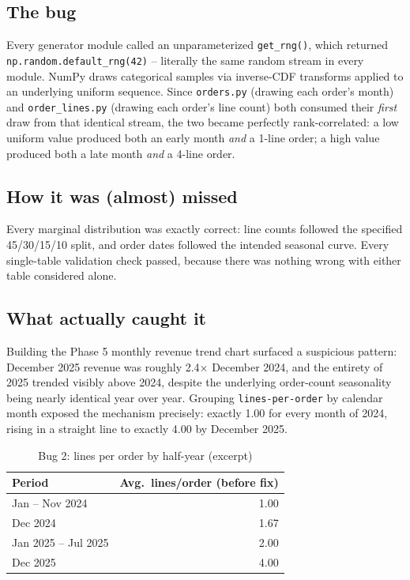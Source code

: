 \documentclass[11pt,a4paper]{report}
\begin{document}
\subsection*{The bug}
Every generator module called an unparameterized \texttt{get\_rng()}, which
returned \texttt{np.random.default\_rng(42)} -- literally the same random
stream in every module. NumPy draws categorical samples via inverse-CDF
transforms applied to an underlying uniform sequence. Since
\texttt{orders.py} (drawing each order's month) and \texttt{order\_lines.py}
(drawing each order's line count) both consumed their \emph{first} draw
from that identical stream, the two became perfectly rank-correlated: a
low uniform value produced both an early month \emph{and} a 1-line order; a
high value produced both a late month \emph{and} a 4-line order.

\subsection*{How it was (almost) missed}
Every marginal distribution was exactly correct: line counts followed the
specified 45/30/15/10 split, and order dates followed the intended seasonal
curve. Every single-table validation check passed, because there was
nothing wrong with either table considered alone.

\subsection*{What actually caught it}
Building the Phase 5 monthly revenue trend chart surfaced a suspicious
pattern: December 2025 revenue was roughly 2.4$\times$ December 2024, and
the entirety of 2025 trended visibly above 2024, despite the underlying
order-count seasonality being nearly identical year over year. Grouping
\texttt{lines-per-order} by calendar month exposed the mechanism precisely:
exactly 1.00 for every month of 2024, rising in a straight line to exactly
4.00 by December 2025.

\begin{table}[H]
\centering
\caption{Bug 2: lines per order by half-year (excerpt)}
\begin{tabular}{lr}
\toprule
\textbf{Period} & \textbf{Avg.\ lines/order (before fix)} \\
\midrule
Jan -- Nov 2024 & 1.00 \\
Dec 2024 & 1.67 \\
Jan 2025 -- Jul 2025 & 2.00 \\
Dec 2025 & 4.00 \\
\bottomrule
\end{tabular}
\end{table}
\end{document}
